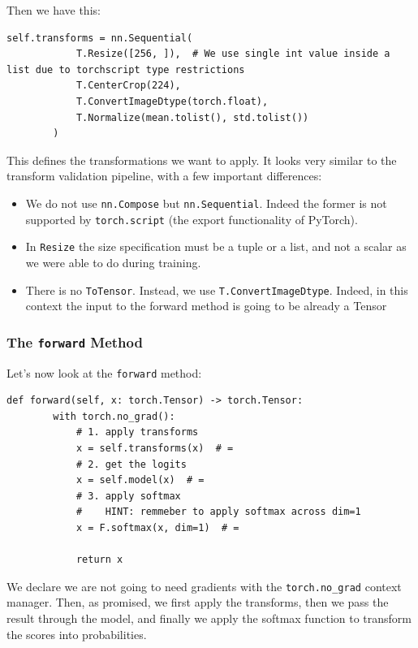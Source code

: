 Then we have this:
\begin{lstlisting}
self.transforms = nn.Sequential(
            T.Resize([256, ]),  # We use single int value inside a list due to torchscript type restrictions
            T.CenterCrop(224),
            T.ConvertImageDtype(torch.float),
            T.Normalize(mean.tolist(), std.tolist())
        )
\end{lstlisting}

This defines the transformations we want to apply. It looks very similar to the transform validation pipeline, with a few important differences:

\begin{itemize}
    \item We do not use \lstinline{nn.Compose} but \lstinline{nn.Sequential}. Indeed the former is not supported by \lstinline{torch.script} (the export functionality of PyTorch).
    \item In \lstinline{Resize} the size specification must be a tuple or a list, and not a scalar as we were able to do during training.
    \item There is no \lstinline{ToTensor}. Instead, we use \lstinline{T.ConvertImageDtype}. Indeed, in this context the input to the forward method is going to be already a Tensor
\end{itemize}

\subsubsection{The \lstinline{forward} Method}

Let's now look at the \lstinline{forward} method:
\begin{lstlisting}
def forward(self, x: torch.Tensor) -> torch.Tensor:
        with torch.no_grad():
            # 1. apply transforms
            x = self.transforms(x)  # =
            # 2. get the logits
            x = self.model(x)  # =
            # 3. apply softmax
            #    HINT: remmeber to apply softmax across dim=1
            x = F.softmax(x, dim=1)  # =

            return x
\end{lstlisting}

We declare we are not going to need gradients with the \lstinline{torch.no_grad} context manager. Then, as promised, we first apply the transforms, then we pass the result through the model, and finally we apply the softmax function to transform the scores into probabilities.

